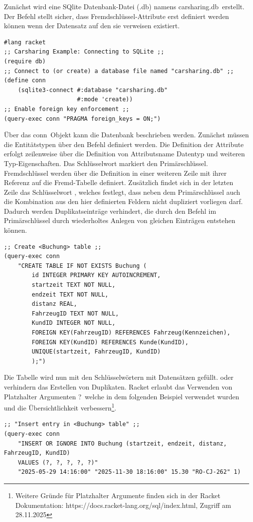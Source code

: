Zunächst wird eine SQlite Datenbank-Datei (.db) namens \glqq carsharing.db\grqq\ erstellt. Der Befehl  stellt sicher, dass Fremdschlüssel-Attribute erst definiert werden können wenn der Datensatz auf den sie verweisen existiert.
\begin{lstlisting}[language=racketSQL]
#lang racket
;; Carsharing Example: Connecting to SQLite ;; 
(require db)
;; Connect to (or create) a database file named "carsharing.db" ;;
(define conn
    (sqlite3-connect #:database "carsharing.db"
                     #:mode 'create))
;; Enable foreign key enforcement ;;
(query-exec conn "PRAGMA foreign_keys = ON;")
\end{lstlisting}

Über das \glqq conn\grqq\ Objekt kann die Datenbank beschrieben werden. Zunächst müssen die Entitätstypen über den Befehl  definiert werden. Die Definition der Attribute erfolgt zeilenweise über die Definition von Attributsname Datentyp und weiteren Typ-Eigenschaften. Das Schlüsselwort  markiert den Primärschlüssel. Fremdschlüssel werden über die  Definition in einer weiteren Zeile mit ihrer Referenz auf die Fremd-Tabelle definiert. Zusätzlich findet sich in der letzten Zeile das Schlüsselwort , welches festlegt, dass neben dem Primärschlüssel auch die Kombination aus den hier definierten Feldern nicht dupliziert vorliegen darf. Dadurch werden Duplikatseinträge verhindert, die durch den Befehl  im Primärschlüssel durch wiederholtes Anlegen von gleichen Einträgen entstehen können.
\begin{lstlisting}[language=racketSQL]
;; Create <Buchung> table ;; 
(query-exec conn
	"CREATE TABLE IF NOT EXISTS Buchung (
		id INTEGER PRIMARY KEY AUTOINCREMENT,
		startzeit TEXT NOT NULL,
		endzeit TEXT NOT NULL,
		distanz REAL,
		FahrzeugID TEXT NOT NULL,
		KundID INTEGER NOT NULL,
		FOREIGN KEY(FahrzeugID) REFERENCES Fahrzeug(Kennzeichen),
		FOREIGN KEY(KundID) REFERENCES Kunde(KundID),
		UNIQUE(startzeit, FahrzeugID, KundID)
		);")
\end{lstlisting}

Die Tabelle wird nun mit den Schlüsselwörtern  mit Datensätzen gefüllt.  oder  verhindern das Erstellen von Duplikaten. Racket erlaubt das Verwenden von Platzhalter Argumenten \glqq ?\grqq\, welche in dem folgenden Beispiel verwendet wurden und die Übersichtlichkeit verbessern\footnote{Weitere Gründe für Platzhalter Argumente finden sich in der Racket Dokumentation: https://docs.racket-lang.org/sql/index.html, Zugriff am 28.11.2025}.
\begin{lstlisting}[language=racketSQL]
;; "Insert entry in <Buchung> table" ;;
(query-exec conn
	"INSERT OR IGNORE INTO Buchung (startzeit, endzeit, distanz, FahrzeugID, KundID)
	VALUES (?, ?, ?, ?, ?)"
	"2025-05-29 14:16:00" "2025-11-30 18:16:00" 15.30 "RO-CJ-262" 1)
\end{lstlisting}

